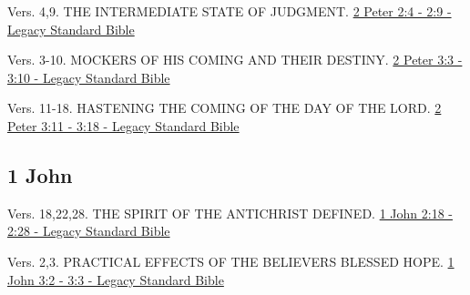 \documentclass[
  ignorenonframetext,
]{beamer}
\begin{document}
\begin{frame}{2}
\label{section-247}
\begin{block}{Vers. 4,9. THE INTERMEDIATE STATE OF JUDGMENT.}
\label{vers.-49.-the-intermediate-state-of-judgment.}
\href{https://read.lsbible.org/?q=2pet2\%3A4-9}{2 Peter 2:4 - 2:9 -
Legacy Standard Bible}
\end{block}
\end{frame}

\begin{frame}{3}
\label{section-248}
\begin{block}{Vers. 3-10. MOCKERS OF HIS COMING AND THEIR DESTINY.}
\label{vers.-3-10.-mockers-of-his-coming-and-their-destiny.}
\href{https://read.lsbible.org/?q=2pet3\%3A3-10}{2 Peter 3:3 - 3:10 -
Legacy Standard Bible}
\end{block}

\begin{block}{Vers. 11-18. HASTENING THE COMING OF THE DAY OF THE LORD.}
\label{vers.-11-18.-hastening-the-coming-of-the-day-of-the-lord.}
\href{https://read.lsbible.org/?q=2pet3\%3A11-18}{2 Peter 3:11 - 3:18 -
Legacy Standard Bible}
\end{block}
\end{frame}

\subsection{1 John}\label{john-1}

\begin{frame}{2}
\label{section-249}
\begin{block}{Vers. 18,22,28. THE SPIRIT OF THE ANTICHRIST DEFINED.}
\label{vers.-182228.-the-spirit-of-the-antichrist-defined.}
\href{https://read.lsbible.org/?q=1jn2\%3A18-28}{1 John 2:18 - 2:28 -
Legacy Standard Bible}
\end{block}
\end{frame}

\begin{frame}{3}
\label{section-250}
\begin{block}{Vers. 2,3. PRACTICAL EFFECTS OF THE
BELIEVER\textquotesingle S BLESSED HOPE.}
\label{vers.-23.-practical-effects-of-the-believers-blessed-hope.}
\href{https://read.lsbible.org/?q=1jn3\%3A2-3}{1 John 3:2 - 3:3 - Legacy
Standard Bible}
\end{block}
\end{frame}
\end{document}
